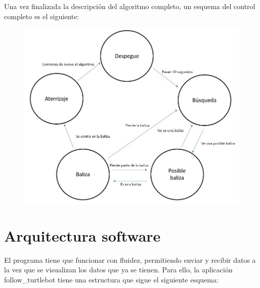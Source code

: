 \hspace{1 cm} Una vez finalizada la descripci\'on del algoritmo completo, un esquema del control completo es el siguiente:
\begin{figure}[H]
	\centering
		\includegraphics[width=1\textwidth]{imgs/EsquemaAlgoritmo.jpg}
	\label{fig:Esquema_control}
\end{figure}





\section{Arquitectura software}

\hspace{1 cm} El programa tiene que funcionar con fluidez, permitiendo enviar y recibir datos a la vez que se visualizan los datos que ya se tienen. Para ello, la aplicaci\'on follow\_turtlebot tiene una estructura que sigue el siguiente esquema:


